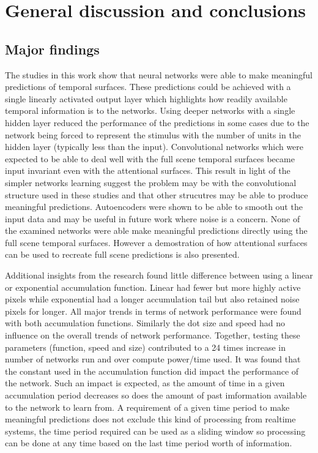 \chapter{General discussion and conclusions}

\section{Major findings}
The studies in this work show that neural networks were able to make meaningful predictions of temporal surfaces.
These predictions could be achieved with a single linearly activated output layer which highlights how readily available temporal information is to the networks.
Using deeper networks with a single hidden layer reduced the performance of the predictions in some cases due to the network being forced to represent the stimulus with the number of units in the hidden layer (typically less than the input). 
Convolutional networks which were expected to be able to deal well with the full scene temporal surfaces became input invariant even with the attentional surfaces.
This result in light of the simpler networks learning suggest the problem may be with the convolutional structure used in these studies and that other strucutres may be able to produce meaningful predictions.
Autoencoders were shown to be able to smooth out the input data and may be useful in future work where noise is a concern. 
None of the examined networks were able make meaningful predictions directly using the full scene temporal surfaces.
However a demostration of how attentional surfaces can be used to recreate full scene predictions is also presented. 

Additional insights from the research found little difference between using a linear or exponential accumulation function. 
Linear had fewer but more highly active pixels while exponential had a longer accumulation tail but also retained noise pixels for longer.
All major trends in terms of network performance were found with both accumulation functions.
Similarly the dot size and speed had no influence on the overall trends of network performance. 
Together, testing these parameters (function, speed and size) contributed to a 24 times increase in number of networks run and over compute power/time used. 
It was found that the constant used in the accumulation function did impact the performance of the network.
Such an impact is expected, as the amount of time in a given accumulation period decreases so does the amount of past imformation available to the network to learn from. 
A requirement of a given time period to make meaningful predictions does not exclude this kind of processing from realtime systems, the time period required can be used as a sliding window so processing can be done at any time based on the last time period worth of information. 

